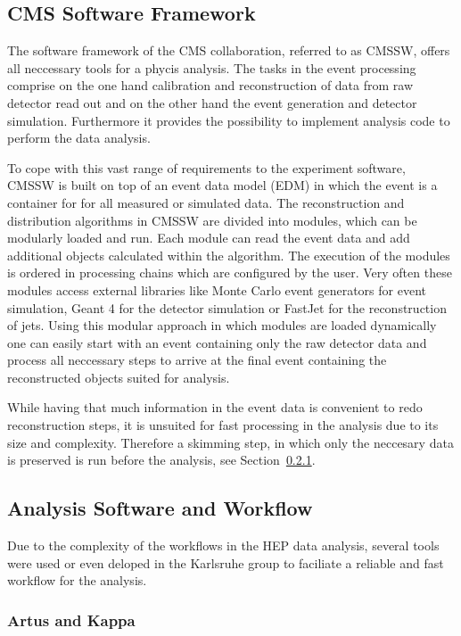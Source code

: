 \subsection{CMS Software Framework}

The software framework of the CMS collaboration, referred to as CMSSW, offers
all neccessary tools for a phycis analysis. The tasks in the event processing
comprise on the one hand calibration and reconstruction of data from raw
detector read out and on the other hand the event generation and detector
simulation. Furthermore it provides the possibility to implement analysis code
to perform the data analysis. 

To cope with this vast range of requirements to the experiment software, CMSSW
is built on top of an event data model (EDM) in which the event is a
container for for all measured or simulated data. The reconstruction and
distribution algorithms in CMSSW are divided into modules, which can be
modularly loaded and run. Each module can read the event data and add additional
objects calculated within the algorithm. The execution of the modules is ordered
in processing chains which are configured by the user. Very often these modules
access external libraries like Monte Carlo event generators for event
simulation, Geant 4 for the detector simulation or FastJet for the
reconstruction of jets. Using this modular approach in which modules are loaded
dynamically one can easily start with an event containing only the raw detector
data and process all neccessary steps to arrive at the final event containing
the reconstructed objects suited for analysis.

While having that much information in the event data is convenient to redo
reconstruction steps, it is unsuited for fast processing in the analysis due to
its size and complexity. Therefore a skimming step, in which only the neccesary
data is preserved is run before the analysis, see Section~\ref{artus_kappa}.

\subsection{Analysis Software and Workflow}

Due to the complexity of the workflows in the HEP data analysis, several tools
were used or even deloped in the Karlsruhe group to faciliate a reliable and
fast workflow for the analysis. 

\subsubsection{Artus and Kappa}
\label{artus_kappa}


